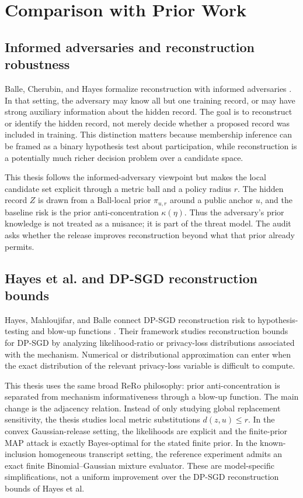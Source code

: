 \documentclass[11pt,a4paper]{report}
\theoremstyle{plain}
\theoremstyle{definition}
\theoremstyle{remark}
\begin{document}
\chapter{Comparison with Prior Work}
\label{ch:prior-work}

\section{Informed adversaries and reconstruction robustness}
\label{sec:compare-informed-adversaries}

Balle, Cherubin, and Hayes formalize reconstruction with informed adversaries \cite{balle2022informed}.  In that setting, the adversary may know all but one training record, or may have strong auxiliary information about the hidden record.  The goal is to reconstruct or identify the hidden record, not merely decide whether a proposed record was included in training.  This distinction matters because membership inference can be framed as a binary hypothesis test about participation, while reconstruction is a potentially much richer decision problem over a candidate space.

This thesis follows the informed-adversary viewpoint but makes the local candidate set explicit through a metric ball and a policy radius $r$.  The hidden record $Z$ is drawn from a Ball-local prior $\pi_{u,r}$ around a public anchor $u$, and the baseline risk is the prior anti-concentration $\kappa(\eta)$.  Thus the adversary's prior knowledge is not treated as a nuisance; it is part of the threat model.  The audit asks whether the release improves reconstruction beyond what that prior already permits.

\section{Hayes et al. and DP-SGD reconstruction bounds}
\label{sec:compare-hayes}

Hayes, Mahloujifar, and Balle connect DP-SGD reconstruction risk to hypothesis-testing and blow-up functions \cite{hayes2023bounding}.  Their framework studies reconstruction bounds for DP-SGD by analyzing likelihood-ratio or privacy-loss distributions associated with the mechanism.  Numerical or distributional approximation can enter when the exact distribution of the relevant privacy-loss variable is difficult to compute.

This thesis uses the same broad ReRo philosophy: prior anti-concentration is separated from mechanism informativeness through a blow-up function.  The main change is the adjacency relation.  Instead of only studying global replacement sensitivity, the thesis studies local metric substitutions $d(z,u)\le r$.  In the convex Gaussian-release setting, the likelihoods are explicit and the finite-prior MAP attack is exactly Bayes-optimal for the stated finite prior.  In the known-inclusion homogeneous transcript setting, the reference experiment admits an exact finite Binomial--Gaussian mixture evaluator.  These are model-specific simplifications, not a uniform improvement over the DP-SGD reconstruction bounds of Hayes et al.
\end{document}
